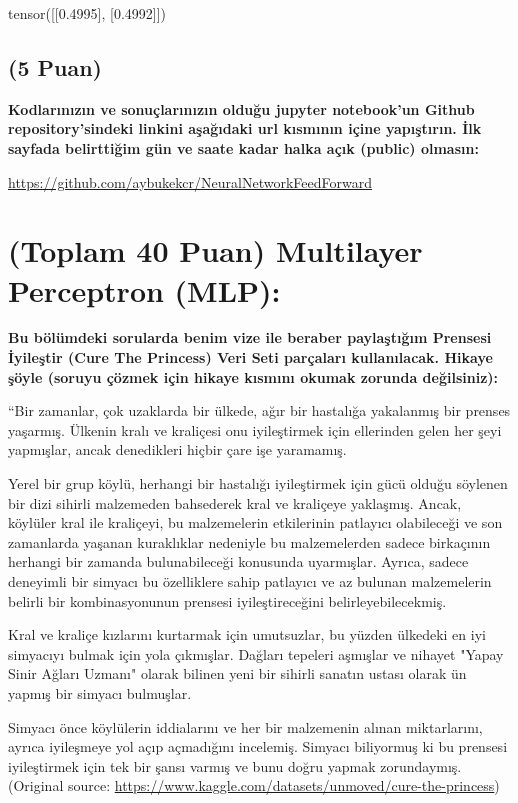 \documentclass[11pt]{article}
\begin{document}
tensor([[0.4995],
        [0.4992]])

\subsection{(5 Puan)} \textbf{Kodlarınızın ve sonuçlarınızın olduğu jupyter notebook'un Github repository'sindeki linkini aşağıdaki url kısmının içine yapıştırın. İlk sayfada belirttiğim gün ve saate kadar halka açık (public) olmasın:}

\url{https://github.com/aybukekcr/NeuralNetworkFeedForward}

\section{(Toplam 40 Puan) Multilayer Perceptron (MLP):} 
\textbf{Bu bölümdeki sorularda benim vize ile beraber paylaştığım Prensesi İyileştir (Cure The Princess) Veri Seti parçaları kullanılacak. Hikaye şöyle (soruyu çözmek için hikaye kısmını okumak zorunda değilsiniz):} 

``Bir zamanlar, çok uzaklarda bir ülkede, ağır bir hastalığa yakalanmış bir prenses yaşarmış. Ülkenin kralı ve kraliçesi onu iyileştirmek için ellerinden gelen her şeyi yapmışlar, ancak denedikleri hiçbir çare işe yaramamış.

Yerel bir grup köylü, herhangi bir hastalığı iyileştirmek için gücü olduğu söylenen bir dizi sihirli malzemeden bahsederek kral ve kraliçeye yaklaşmış. Ancak, köylüler kral ile kraliçeyi, bu malzemelerin etkilerinin patlayıcı olabileceği ve son zamanlarda yaşanan kuraklıklar nedeniyle bu malzemelerden sadece birkaçının herhangi bir zamanda bulunabileceği konusunda uyarmışlar. Ayrıca, sadece deneyimli bir simyacı bu özelliklere sahip patlayıcı ve az bulunan malzemelerin belirli bir kombinasyonunun prensesi iyileştireceğini belirleyebilecekmiş.

Kral ve kraliçe kızlarını kurtarmak için umutsuzlar, bu yüzden ülkedeki en iyi simyacıyı bulmak için yola çıkmışlar. Dağları tepeleri aşmışlar ve nihayet "Yapay Sinir Ağları Uzmanı" olarak bilinen yeni bir sihirli sanatın ustası olarak ün yapmış bir simyacı bulmuşlar.

Simyacı önce köylülerin iddialarını ve her bir malzemenin alınan miktarlarını, ayrıca iyileşmeye yol açıp açmadığını incelemiş. Simyacı biliyormuş ki bu prensesi iyileştirmek için tek bir şansı varmış ve bunu doğru yapmak zorundaymış. (Original source: \url{https://www.kaggle.com/datasets/unmoved/cure-the-princess})
\end{document}
